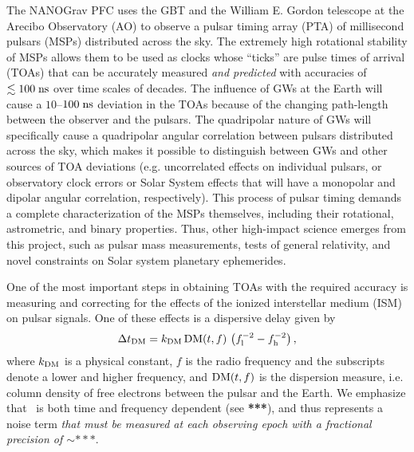\documentclass[10pt]{myNSF}
\begin{document}
The NANOGrav PFC uses the GBT and the William E. Gordon telescope at
the Arecibo Observatory (AO) to observe a pulsar timing array (PTA) of
millisecond pulsars (MSPs) distributed across the sky.  The extremely
high rotational stability of MSPs allows them to be used as clocks
whose ``ticks'' are pulse times of arrival (TOAs) that can be
accurately measured \emph{and predicted} with accuracies of $\lesssim
100\; \textrm{ns}$ over time scales of decades.  The influence of GWs at the
Earth will cause a $10$--$100\; \textrm{ns}$ deviation in the TOAs because of
the changing path-length between the observer and the pulsars.  The
quadripolar nature of GWs will specifically cause a quadripolar
angular correlation between pulsars distributed across the sky, which
makes it possible to distinguish between GWs and other sources of TOA
deviations (e.g. uncorrelated effects on individual pulsars, or
observatory clock errors or Solar System effects that will have a
monopolar and dipolar angular correlation, respectively).  This
process of pulsar timing demands a complete characterization of the
MSPs themselves, including their rotational, astrometric, and binary
properties.  Thus, other high-impact science emerges from this
project, such as pulsar mass measurements, tests of general
relativity, and novel constraints on Solar system planetary
ephemerides.

One of the most important steps in obtaining TOAs with the required
accuracy is measuring and correcting for the effects of the ionized
interstellar medium (ISM) on pulsar signals.  One of these effects is
a dispersive delay given by
\begin{equation}
  \Delta t_{\rm DM} = k_{\rm DM} \, \textrm{DM}(t,f)\, \left( f_{\rm l}^{-2} -
  f_{\rm h}^{-2} \right) ,
\end{equation}
where $k_{\rm DM}$ is a physical constant, $f$ is the radio frequency
and the subscripts denote a lower and higher frequency, and $\textrm{DM}(t,f)$
is the dispersion measure, i.e. column density of free electrons
between the pulsar and the Earth.  We emphasize that \DM\ is both time
and frequency dependent (see \textbf{***}), and thus represents a
noise term \emph{that must be measured at each observing epoch with a
  fractional precision of $\sim ***$}.
\end{document}
